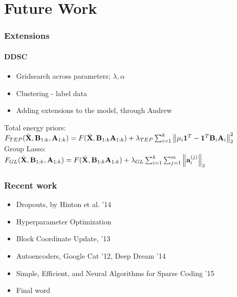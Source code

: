 \documentclass{beamer}              %
\begin{document}
\section{Future Work}
\begin{frame}
	\frametitle{Extensions}
	\framesubtitle{DDSC}
	\begin{itemize}
		\item{Gridsearch across parameters; $\lambda,\alpha$}
		\item{Clustering - label data}
		\item{Adding extensions to the model, through Andrew}
	\end{itemize}
	Total energy priors: \\
	\vspace{0.1in}
	$F_{TEP}(\bar{\mathbf{X}},\mathbf{B}_{1:k},\mathbf{A}_{1:k}) = F(\bar{\mathbf{X}},\mathbf{B}_{1:k} \mathbf{A}_{1:k}) + \lambda_{TEP}\sum_{i=1}^k \left\lVert\mu_i\mathbf{1}^T-\mathbf{1}^T\mathbf{B}_i\mathbf{A}_i\right\rVert^2_2$ \\
	\vspace{0.1in}
	Group Lasso: \\
	$F_{GL}(\bar{\mathbf{X}},\mathbf{B}_{1:k},\mathbf{A}_{1:k}) = F(\bar{\mathbf{X}},\mathbf{B}_{1:k} \mathbf{A}_{1:k}) + \lambda_{GL}\sum_{i=1}^k \sum_{j=1}^m \left\lVert\mathbf{a}_i^{(j)}\right\rVert_2$ \\
\end{frame}

\begin{frame}
	\frametitle{Recent work}
	\begin{itemize}
		\item{Dropouts, by Hinton et al. '14}%
		\item{Hyperparameter Optimization}
		\item{Block Coordinate Update, '13}
		\item{Autoencoders, Google Cat '12, Deep Dream '14}%
		\item{Simple, Efficient, and Neural Algorithms for Sparse Coding '15}
		\item{Final word}
	\end{itemize}
\end{frame}
\end{document}
